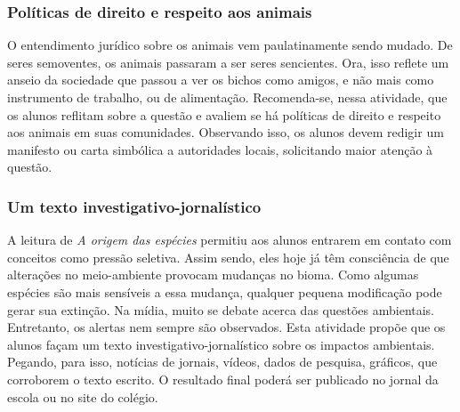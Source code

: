 \documentclass[11pt]{extarticle}
\begin{document}
\subsubsection{Políticas de direito e respeito aos animais}

O entendimento jurídico sobre os animais vem paulatinamente sendo
mudado. De seres semoventes, os animais passaram a ser seres sencientes.
Ora, isso reflete um anseio da sociedade que passou a ver os bichos como
amigos, e não mais como instrumento de trabalho, ou de alimentação.
Recomenda-se, nessa atividade, que os alunos reflitam sobre a questão
e avaliem se há políticas de direito e respeito aos animais em suas
comunidades. Observando isso, os alunos devem redigir um manifesto ou carta
simbólica a autoridades locais, solicitando maior atenção à questão.

\subsubsection{Um texto investigativo-jornalístico}

A leitura de \emph{A origem das espécies} permitiu aos
      alunos entrarem em contato com conceitos como pressão seletiva. Assim
      sendo, eles hoje já têm consciência de que alterações no meio-ambiente
      provocam mudanças no bioma. Como algumas espécies são mais sensíveis
      a essa mudança, qualquer pequena modificação pode gerar sua
      extinção. Na mídia, muito se debate acerca das questões ambientais.
      Entretanto, os alertas nem sempre são observados. Esta atividade propõe
      que os alunos façam um texto investigativo-jornalístico sobre os impactos
      ambientais. Pegando, para isso, notícias de jornais, vídeos, dados de
      pesquisa, gráficos, que corroborem o texto escrito. O resultado final
      poderá ser publicado no jornal da escola ou no site do colégio.

\end{document}
